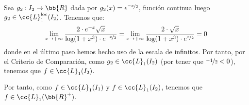 \begin{ejercicio}
\begin{itemize}
        Sea $g_2:I_2\to \bb{R}$ dada por $g_2(x)=e^{\nicefrac{-x}{2}}$, función continua luego $g_2\in \cc{L}_1^{\text{loc}}(I_2)$. Tenemos que:
        \begin{align*}
            \lim_{x\to +\infty} \dfrac{2\cdot e^{-x} \sqrt{x}}{\log(1+x^3)\cdot e^{\nicefrac{-x}{2}}}
            = \lim_{x\to +\infty} \dfrac{2\cdot \sqrt{x}}{\log(1+x^3)\cdot e^{\nicefrac{x}{2}}}
            = 0
        \end{align*}
        donde en el último paso hemos hecho uso de la escala de infinitos. Por tanto, por el Criterio de Comparación, como $g_2\in \cc{L}_1(I_2)$ (por tener que $\nicefrac{-1}{2}<0$), tenemos que $f\in \cc{L}_1(I_2)$.
    \end{itemize}
    Por tanto, como $f\in \cc{L}_1(I_1)$ y $f\in \cc{L}_1(I_2)$, tenemos que $f\in \cc{L}_1(\bb{R}^+)$.
\end{ejercicio}
